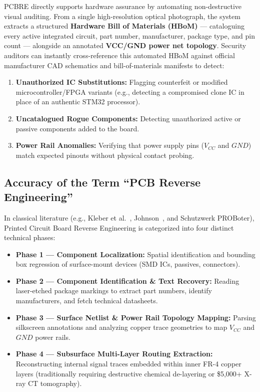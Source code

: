 \documentclass[12pt,a4paper]{report}
\begin{document}
PCBRE directly supports hardware assurance by automating non-destructive visual auditing. From a single high-resolution optical photograph, the system extracts a structured \textbf{Hardware Bill of Materials (HBoM)} --- cataloguing every active integrated circuit, part number, manufacturer, package type, and pin count --- alongside an annotated \textbf{VCC/GND power net topology}. Security auditors can instantly cross-reference this automated HBoM against official manufacturer CAD schematics and bill-of-materials manifests to detect:
\begin{enumerate}
  \item \textbf{Unauthorized IC Substitutions:} Flagging counterfeit or modified microcontroller/FPGA variants (e.g., detecting a compromised clone IC in place of an authentic STM32 processor).
  \item \textbf{Uncatalogued Rogue Components:} Detecting unauthorized active or passive components added to the board.
  \item \textbf{Power Rail Anomalies:} Verifying that power supply pins ($V_{CC}$ and $GND$) match expected pinouts without physical contact probing.
\end{enumerate}

\subsection{Accuracy of the Term ``PCB Reverse Engineering''}
In classical literature (e.g., Kleber et al.~\cite{kleber2017woot}, Johnson~\cite{johnson2014}, and Schutzwerk PROBoter), Printed Circuit Board Reverse Engineering is categorized into four distinct technical phases:
\begin{itemize}
  \item \textbf{Phase 1 --- Component Localization:} Spatial identification and bounding box regression of surface-mount devices (SMD ICs, passives, connectors).
  \item \textbf{Phase 2 --- Component Identification \& Text Recovery:} Reading laser-etched package markings to extract part numbers, identify manufacturers, and fetch technical datasheets.
  \item \textbf{Phase 3 --- Surface Netlist \& Power Rail Topology Mapping:} Parsing silkscreen annotations and analyzing copper trace geometries to map $V_{CC}$ and $GND$ power rails.
  \item \textbf{Phase 4 --- Subsurface Multi-Layer Routing Extraction:} Reconstructing internal signal traces embedded within inner FR-4 copper layers (traditionally requiring destructive chemical de-layering or \$5,000+ X-ray CT tomography).
\end{itemize}
\end{document}
